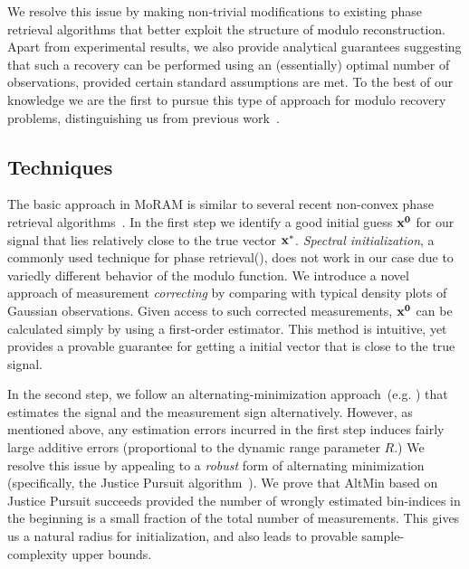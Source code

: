 We resolve this issue by making non-trivial modifications to existing phase retrieval algorithms that better exploit the structure of modulo reconstruction. Apart from experimental results, we also provide analytical guarantees suggesting that such a recovery can be performed using an (essentially) optimal number of observations, provided certain standard assumptions are met. To the best of our knowledge we are the first to pursue this type of approach for modulo recovery problems, distinguishing us from previous work~\cite{ICCP15_Zhao,Bhandari}. 

\subsection{Techniques}
The basic approach in MoRAM is similar to several recent non-convex phase retrieval algorithms~\cite{wang2016sparse,wang2016solving,candes2015phase, zhang2016reshaped,chen2015solving, cai2016optimal}. In the first step we identify a good initial guess $\mathbf{x^0}$ for our signal that lies relatively close to the true vector $\mathbf{x^*}$. \emph{Spectral initialization}, a commonly used technique for phase retrieval(\cite{netrapalli2013phase}), does not work in our case due to variedly different behavior of the modulo function.
We introduce a novel approach of measurement \emph{correcting} by comparing with typical density plots of Gaussian observations. Given access to such corrected measurements, $\mathbf{x^0}$ can be calculated simply by using a first-order estimator. This method is intuitive, yet provides a provable guarantee for getting a initial vector that is close to the true signal. 

In the second step, we follow an alternating-minimization approach~(e.g. \cite{netrapalli2013phase,Jagatap2017}) that estimates the signal and the measurement sign alternatively. However, as mentioned above, any estimation errors incurred in the first step induces fairly large additive errors (proportional to the dynamic range parameter $R$.) We resolve this issue by appealing to a \emph{robust} form of alternating minimization (specifically, the Justice Pursuit algorithm~\cite{Laska2009}). We prove that AltMin based on Justice Pursuit succeeds provided the number of wrongly estimated bin-indices in the beginning is a small fraction of the total number of measurements. This gives us a natural radius for initialization, and also leads to provable sample-complexity upper bounds.


